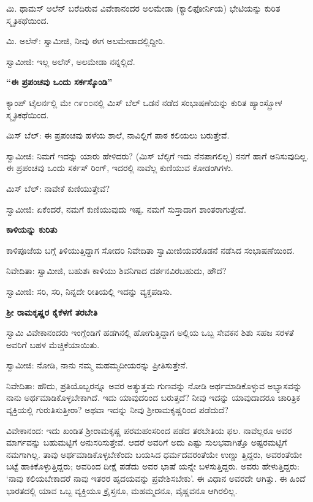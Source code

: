 ಮಿ. ಥಾಮಸ್ ಅಲೆನ್ ಬರೆದಿರುವ ವಿವೇಕಾನಂದರ ಅಲಮೇಡಾ (ಕ್ಯಾಲಿಫೋರ್ನಿಯ) ಭೇಟಿಯನ್ನು ಕುರಿತ ಸ್ಮೃತಿಕಥೆಯಿಂದ.

ಮಿ. ಅಲೆನ್: ಸ್ವಾಮೀಜಿ, ನೀವು ಈಗ ಅಲಮೇಡಾದಲ್ಲಿದ್ದೀರಿ.

ಸ್ವಾಮೀಜಿ: ಇಲ್ಲ ಅಲೆನ್, ಅಲಮೇಡಾ ನನ್ನಲ್ಲಿದೆ.

\begin{center}
\textbf{“ಈ ಪ್ರಪಂಚವು ಒಂದು ಸರ್ಕಸ್ಕೊಂಡಿ”}
\end{center}

ಕ್ಯಾಂಪ್ ಟೈಲರ್ನಲ್ಲಿ ಮೇ ೧೯೦೦ನಲ್ಲಿ ಮಿಸ್ ಬೆಲ್ ಒಡನೆ ನಡೆದ ಸಂಭಾಷಣೆಯನ್ನು ಕುರಿತ ಹ್ಯಾಂಸ್ಬ್ರೋಳ ಸ್ಮೃತಿಕಥೆಯಿಂದ.

ಮಿಸ್ ಬೆಲ್: ಈ ಪ್ರಪಂಚವು ಹಳೆಯ ಶಾಲೆ, ನಾವಿಲ್ಲಿಗೆ ಪಾಠ ಕಲಿಯಲು ಬರುತ್ತೇವೆ.

ಸ್ವಾಮೀಜಿ: ನಿಮಗೆ ಇದನ್ನು ಯಾರು ಹೇಳಿದರು? (ಮಿಸ್ ಬೆಲ್ಳಿಗೆ ಇದು ನೆನಪಾಗಲಿಲ್ಲ) ನನಗೆ ಹಾಗೆ ಅನಿಸುವುದಿಲ್ಲ. ಈ ಪ್ರಪಂಚವು ಒಂದು ಸರ್ಕಸ್ ರಿಂಗ್, ಇದರಲ್ಲಿ ನಾವೆಲ್ಲ ಕುಣಿಯುವ ಕೋಡಂಗಿಗಳು.

ಮಿಸ್ ಬೆಲ್: ನಾವೇಕೆ ಕುಣಿಯುತ್ತೇವೆ?

ಸ್ವಾಮೀಜಿ: ಏಕೆಂದರೆ, ನಮಗೆ ಕುಣಿಯುವುದು ಇಷ್ಟ. ನಮಗೆ ಸುಸ್ತಾದಾಗ ಶಾಂತರಾಗುತ್ತೇವೆ.

\begin{center}
\textbf{ಕಾಳಿಯನ್ನು ಕುರಿತು}
\end{center}

ಕಾಳಿಪೂಜೆಯ ಬಗ್ಗೆ ತಿಳಿಯುತ್ತಿದ್ದಾಗ ಸೋದರಿ ನಿವೇದಿತಾ ಸ್ವಾಮೀಜಿಯವರೊಡನೆ ನಡೆಸಿದ ಸಂಭಾಷಣೆಯಿಂದ.

ನಿವೇದಿತಾ: ಸ್ವಾಮೀಜಿ, ಬಹುಶಃ ಕಾಳಿಯು ಶಿವನಿಗಾದ ದರ್ಶನವಿರಬಹುದು, ಹೌದೆ?

ಸ್ವಾಮೀಜಿ: ಸರಿ, ಸರಿ, ನಿನ್ನದೇ ರೀತಿಯಲ್ಲಿ ಇದನ್ನು ವ್ಯಕ್ತಪಡಿಸು.

\begin{center}
\textbf{ಶ‍್ರೀ ರಾಮಕೃಷ್ಣರ ಕೈಕೆಳಗೆ ತರಬೇತಿ}
\end{center}

ಸ್ವಾಮಿ ವಿವೇಕಾನಂದರು ಇಂಗ್ಲೆಂಡಿಗೆ ಹಡಗಿನಲ್ಲಿ ಹೋಗುತ್ತಿದ್ದಾಗ ಅಲ್ಲಿಯ ಒಬ್ಬ ಸೇವಕನ ಶಿಶು ಸಹಜ ಸರಳತೆ ಅವರಿಗೆ ಬಹಳ ಮೆಚ್ಚಿಕೆಯಾಯಿತು.

ಸ್ವಾಮೀಜಿ: ನೋಡಿ, ನಾನು ನಮ್ಮ ಮಹಮ್ಮದೀಯರನ್ನು ಪ್ರೀತಿಸುತ್ತೇನೆ.

ನಿವೇದಿತಾ: ಹೌದು, ಪ್ರತಿಯೊಬ್ಬರನ್ನೂ ಅವರ ಅತ್ಯುತ್ತಮ ಗುಣವನ್ನು ನೋಡಿ ಅರ್ಥಮಾಡಿಕೊಳ್ಳುವ ಅಭ್ಯಾಸವನ್ನು ನಾನು ಅರ್ಥಮಾಡಿಕೊಳ್ಳಬೇಕಾಗಿದೆ. ಇದು ಯಾವುದರಿಂದ ಬರುತ್ತದೆ? ನೀವು ಇದನ್ನು ಯಾವುದಾದರೂ ಚಾರಿತ್ರಿಕ ವ್ಯಕ್ತಿಯಲ್ಲಿ ಗುರುತಿಸುತ್ತೀರಾ? ಅಥವಾ ಇದನ್ನು ನೀವು ಶ‍್ರೀರಾಮಕೃಷ್ಣರಿಂದ ಪಡೆದುದೆ?

ವಿವೇಕಾನಂದ: ಇದು ಖಂಡಿತ ಶ‍್ರೀರಾಮಕೃಷ್ಣ ಪರಮಹಂಸರಿಂದ ಪಡೆದ ತರಬೇತಿಯ ಫಲ. ನಾವೆಲ್ಲರೂ ಅವರ ಮಾರ್ಗವನ್ನು ಬಹುಮಟ್ಟಿಗೆ ಅನುಸರಿಸುತ್ತೇವೆ. ಆದರೆ ಅವರಿಗೆ ಅದು ಎಷ್ಟು ಸುಲಭವಾಗಿತ್ತೊ ಅಷ್ಟರಮಟ್ಟಿಗೆ ನಮಗಾಗಿಲ್ಲ. ತಾವು ಅರ್ಥಮಾಡಿಕೊಳ್ಳಬೇಕೆಂದು ಬಯಸಿದ ಧರ್ಮದವರಂತೆಯೇ ಉಣ್ಣು ತ್ತಿದ್ದರು, ಅವರಂತೆಯೇ ಬಟ್ಟೆ ಹಾಕಿಕೊಳ್ಳುತ್ತಿದ್ದರು; ಅವರಿಂದ ದೀಕ್ಷೆ ಪಡೆದು ಅವರ ಭಾಷೆ ಯನ್ನೇ ಬಳಸುತ್ತಿದ್ದರು. ಅವರು ಹೇಳುತ್ತಿದ್ದರು: ‘ನಾವು ಕಲಿಯಬೇಕಾದರೆ ನಾವು ಇತರರ ಹೃದಯವನ್ನು ಪ್ರವೇಶಿಸಬೇಕು’. ಈ ವಿಧಾನ ಅವರದೇ ಆಗಿತ್ತು. ಈ ಹಿಂದೆ ಭಾರತದಲ್ಲಿ ಯಾವ ಒಬ್ಬ ವ್ಯಕ್ತಿಯೂ ಕ್ರೈಸ್ತನೂ, ಮಹಮ್ಮದನೂ, ವೈಷ್ಣವನೂ ಆಗಿರಲಿಲ್ಲ.

